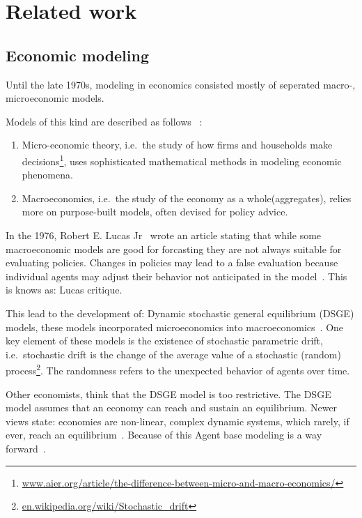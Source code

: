 \section{Related work}\label{sec:related-work}

\subsection{Economic modeling}\label{subsec:economic-modeling}
Until the late 1970s, modeling in economics consisted mostly of seperated macro-, microeconomic models.

Models of this kind are described as follows ~\cite{morgan2012models}:
\begin{enumerate}
  \item Micro-economic theory, i.e.\ the study of how firms and households make decisions\footnote{\url{www.aier.org/article/the-difference-between-micro-and-macro-economics/}}, uses sophisticated mathematical methods in modeling economic phenomena.
  \item Macroeconomics, i.e.\ the study of the economy as a whole\footnotemark[\value{footnote}] (aggregates), relies more on purpose-built models, often devised for policy advice.
\end{enumerate}

In the 1976, Robert E. Lucas Jr~\cite{lucas1976econometric} wrote an article stating that while some macroeconomic models are good for forcasting
they are not always suitable for evaluating policies.
Changes in policies may lead to a false evaluation because individual agents may adjust their behavior not anticipated in the model~\cite{HURTADO2014S12}.
This is knows as: Lucas critique.

This lead to the development of: Dynamic stochastic general equilibrium (DSGE) models, these models incorporated microeconomics into macroeconomics~\cite{moos2019facts}.
One key element of these models is the existence of stochastic parametric drift, i.e.\ stochastic drift is the change of the average value of a stochastic (random) process\footnote{\url{en.wikipedia.org/wiki/Stochastic_drift}}.
The randomness refers to the unexpected behavior of agents over time.

Other economists, think that the DSGE model is too restrictive.
The DSGE model assumes that an economy can reach and sustain an equilibrium.
Newer views state: economies are non-linear, complex dynamic systems, which rarely, if ever, reach an equilibrium~\cite{hamill2016agent}.
Because of this Agent base modeling is a way forward~\cite{hamill2016agent}.

